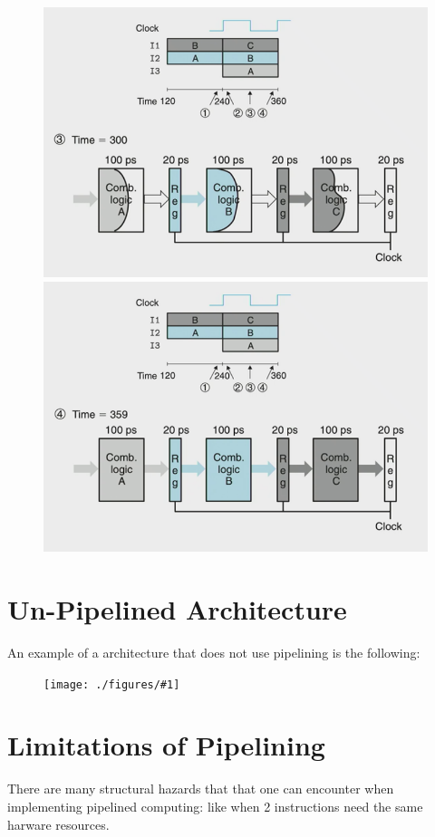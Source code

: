 \documentclass[12pt]{book}
\newcommand{\incimg}[2]{%
       \begin{figure}[h]
               \centering
               \texttt{[image: ./figures/\#1]}
       \end{figure}
}
\begin{document}
 \begin{figure}[h]
         \centering
         \includegraphics[scale=0.5]{./figures/close3.png}
         \includegraphics[scale=0.5]{./figures/close4.png}
 \end{figure}

\pagebreak
 \section*{Un-Pipelined Architecture}
 An example of a architecture that does not use pipelining is the following:
 \incimg{nopipe}{0.5}

 \section*{Limitations of Pipelining}
 There are many structural hazards that that one can encounter when implementing pipelined
 computing: like when 2 instructions need the same harware resources.
\end{document}
